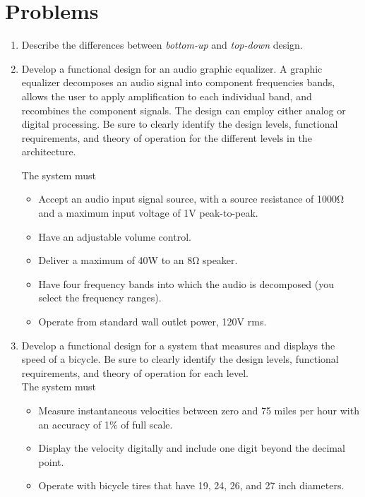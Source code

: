 \section{Problems}
\label{section:problems}

\begin{enumerate}
\def\labelenumi{\arabic{enumi}.}
\item
  Describe the differences between \emph{bottom-up} and \emph{top-down}
  design.
\item
  Develop a functional design for an audio graphic equalizer. A graphic
  equalizer decomposes an audio signal into component frequencies bands,
  allows the user to apply amplification to each individual band, and
  recombines the component signals. The design can employ either analog
  or digital processing. Be sure to clearly identify the design levels,
  functional requirements, and theory of operation for the different
  levels in the architecture.

The system must
\begin{itemize}
\item
  Accept an audio input signal source, with a source resistance of 1000Ω
  and a maximum input voltage of 1V peak-to-peak.
\item
  Have an adjustable volume control.
\item
  Deliver a maximum of 40W to an 8Ω speaker.
\item
  Have four frequency bands into which the audio is decomposed (you
  select the frequency ranges).
\item
  Operate from standard wall outlet power, 120V rms.
  \end{itemize}
  
  \item
    Develop a functional design for a system that measures and displays
    the speed of a bicycle. Be sure to clearly identify the design
    levels, functional requirements, and theory of operation for each
    level.\\
  The system must

\begin{itemize}
\item
  Measure instantaneous velocities between zero and 75 miles per hour
  with an accuracy of 1\% of full scale.
\item
  Display the velocity digitally and include one digit beyond the
  decimal point.
\item
  Operate with bicycle tires that have 19, 24, 26, and 27 inch
  diameters.
\end{itemize}


\end{enumerate}
